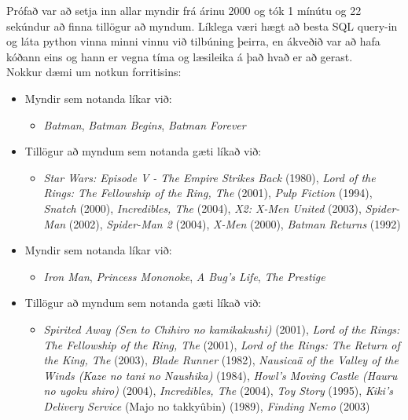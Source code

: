 \documentclass[12pt, git, draft]{rureport}
\begin{document}
Prófað var að setja inn allar myndir frá árinu 2000 og tók 1 mínútu og 22 sekúndur að finna tillögur að myndum. Líklega væri hægt að besta SQL query-in og láta python vinna minni vinnu við tilbúning þeirra, en ákveðið var að hafa kóðann eins og hann er vegna tíma og læsileika á það hvað er að gerast.
\\
Nokkur dæmi um notkun forritisins:
\begin{itemize}
	\item Myndir sem notanda líkar við:
	\begin{itemize}
		\item \textit{Batman}, \textit{Batman Begins}, \textit{Batman Forever}
	\end{itemize}
	\item Tillögur að myndum sem notanda gæti líkað við:
	\begin{itemize}
		\item \textit{Star Wars: Episode V - The Empire Strikes Back}  (1980), \textit{Lord of the Rings: The Fellowship of the Ring, The}  (2001), \textit{Pulp Fiction}  (1994), \textit{Snatch}  (2000), \textit{Incredibles, The}  (2004), \textit{X2: X-Men United}  (2003), \textit{Spider-Man}  (2002), \textit{Spider-Man 2}  (2004), \textit{X-Men}  (2000), \textit{Batman Returns}  (1992)
	\end{itemize}
	
	\item Myndir sem notanda líkar við:
	\begin{itemize}
		\item \textit{Iron Man}, \textit{Princess Mononoke}, \textit{A Bug's Life}, \textit{The Prestige}
	\end{itemize}
	\item Tillögur að myndum sem notanda gæti líkað við:
	\begin{itemize}
		\item \textit{Spirited Away (Sen to Chihiro no kamikakushi)}  (2001), \textit{Lord of the Rings: The Fellowship of the Ring, The}  (2001), \textit{Lord of the Rings: The Return of the King, The}  (2003), \textit{Blade Runner}  (1982), \textit{Nausicaä of the Valley of the Winds (Kaze no tani no Naushika)}  (1984), \textit{Howl's Moving Castle (Hauru no ugoku shiro)}  (2004), \textit{Incredibles, The}  (2004), \textit{Toy Story}  (1995), \textit{Kiki's Delivery Service} (Majo no takkyûbin)  (1989), \textit{Finding Nemo}  (2003)
	\end{itemize}
	

\end{itemize}
\end{document}
